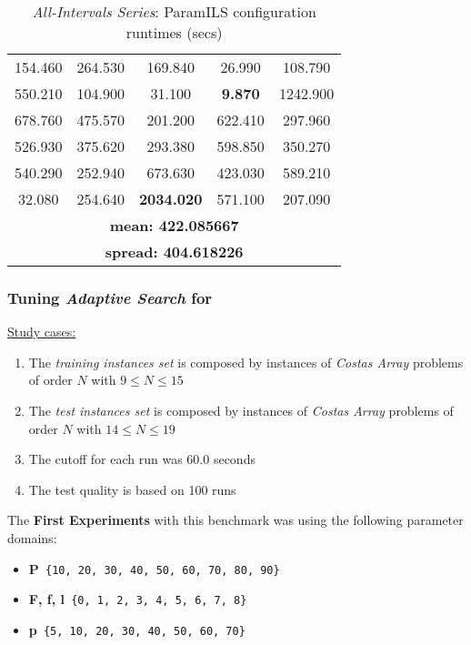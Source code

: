\begin{table}[h]
\centering
\renewcommand{\arraystretch}{1.2}
\begin{tabular}{|ccccc|}
	\hline
	154.460 & 264.530 & 169.840 & 26.990 & 108.790 \\ 
	550.210 & 104.900 & 31.100 & \textcolor{naranja}{\bf 9.870} & 1242.900 \\  
	\hline 
	678.760 & 475.570 & 201.200 & 622.410 & 297.960 \\ 
	526.930 & 375.620 & 293.380 & 598.850 & 350.270 \\  
	\hline 
	540.290 & 252.940 & 673.630 & 423.030 & 589.210 \\ 
	32.080 & 254.640 & \textcolor{intenso}{\bf 2034.020} & 571.100 & 207.090 \\  
	\hline 
	\multicolumn{5}{|c|}{\bf mean: 422.085667}\\
	\multicolumn{5}{|c|}{\bf spread: 404.618226}\\
	\hline
\end{tabular}
\caption{{\it All-Intervals Series}: {\sc ParamILS} configuration runtimes (secs)}\label{table:testaigood}
\end{table} 






\subsubsection{ Tuning {\it Adaptive Search} for  \carrp}

\underline{Study cases:}
\begin{enumerate}
	\item The {\it training instances set} is composed by instances of {\it Costas Array} problems of order $N$ with $9 \leq N \leq 15$
	\item The {\it test instances set} is composed by instances of {\it Costas Array} problems of order $N$ with $14 \leq N \leq 19$
	\item The cutoff for each run was 60.0 seconds
	\item The test quality is based on 100 runs
\end{enumerate}

The {\bf First Experiments} with this benchmark was using the following parameter domains:
\begin{itemize}[itemsep=0.2mm]
	\item {\bf P}\texttt{ \{10, 20, 30, 40, 50, 60, 70, 80, 90\}}
	\item {\bf F, f, l}\texttt{ \{0, 1, 2, 3, 4, 5, 6, 7, 8\}}
	\item {\bf p}\texttt{ \{5, 10, 20, 30, 40, 50, 60, 70\}}
\end{itemize}

